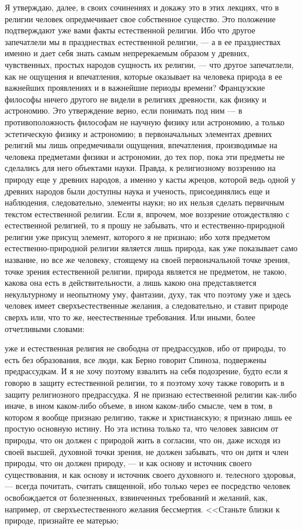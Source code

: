 \documentclass[12pt]{article}
\begin{document}
Я утверждаю, далее, в своих сочинениях и докажу это в этих лекциях, что в религии человек опредмечивает свое собственное существо. Это положение подтверждают уже вами факты естественной религии. Ибо что другое запечатлели мы в празднествах естественной религии, --- а в ее празднествах именно и дает себя знать самым непререкаемым образом у древних, чувственных, простых народов сущность их религии, --- что другое запечатлели, как не ощущения и впечатления, которые оказывает на человека природа в ее важнейших проявлениях и в важнейшие периоды времени? Французские философы ничего другого не видели в религиях древности, как физику и астрономию. Это утверждение верно, если понимать под ним --- в противоположность философам не научную физику или астрономию, а только эстетическую физику и астрономию; в первоначальных элементах древних религий мы лишь опредмечивали ощущения, впечатления, производимые на человека предметами физики и астрономии, до тех пор, пока эти предметы не сделались для него объектами науки. Правда, к религиозному воззрению на природу еще у древних народов, а именно у касты жрецов, которой ведь одной у древних народов были доступны наука и ученость, присоединялись еще и наблюдения, следовательно, элементы науки; но их нельзя сделать первичным текстом естественной религии. Если я, впрочем, мое воззрение отождествляю с естественной религией, то я прошу не забывать, что и естественно-природной религии уже присущ элемент, которого я не признаю; ибо хотя предметом естественно-природной религии является лишь природа, как уже показывает само название, но все же человеку, стоящему на своей первоначальной точке зрения, точке зрения естественной религии, природа является не предметом, не такою, какова она есть в действительности, а лишь какою она представляется некультурному и неопытному уму, фантазии, духу, так что поэтому уже и здесь человек имеет сверхъестественные желания, а следовательно, и ставит природе сверхъ или, что то же, неестественные требования. Или иными, более отчетливыми словами: 

уже и естественная религия не свободна от предрассудков, ибо от природы, то есть без образования, все люди, как Берно говорит Спиноза, подвержены предрассудкам. И я не хочу поэтому взвалить на себя подозрение, будто если я говорю в защиту естественной религии, то я поэтому хочу также говорить и в защиту религиозного предрассудка. Я не признаю естественной религии как-либо иначе, в ином каком-либо объеме, в ином каком-либо смысле, чем в том, в котором я вообще признаю религию, также и христианскую; я признаю лишь ее простую основную истину. Но эта истина только та, что человек зависим от природы, что он должен с природой жить в согласии, что он, даже исходя из своей высшей, духовной точки зрения, не должен забывать, что он дитя и член природы, что он должен природу, --- и как основу и источник своего существования, и как основу и источник своего духовного и. телесного здоровья, --- всегда почитать, считать священной, ибо только через ее посредство человек освобождается от болезненных, взвинченных требований и желаний, как, например, от сверхъестественного желания бессмертия. <<Станьте близки к природе, признайте ее матерью; 
\end{document}

